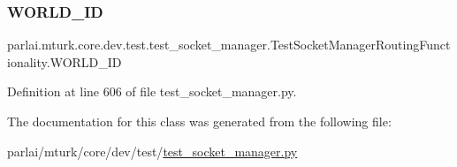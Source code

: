 \subsubsection{\texorpdfstring{W\+O\+R\+L\+D\+\_\+\+ID}{WORLD\_ID}}
{\footnotesize\ttfamily parlai.\+mturk.\+core.\+dev.\+test.\+test\+\_\+socket\+\_\+manager.\+Test\+Socket\+Manager\+Routing\+Functionality.\+W\+O\+R\+L\+D\+\_\+\+ID\hspace{0.3cm}{\ttfamily [static]}}



Definition at line 606 of file test\+\_\+socket\+\_\+manager.\+py.



The documentation for this class was generated from the following file\+:\begin{DoxyCompactItemize}
\item 
parlai/mturk/core/dev/test/\hyperlink{dev_2test_2test__socket__manager_8py}{test\+\_\+socket\+\_\+manager.\+py}\end{DoxyCompactItemize}
